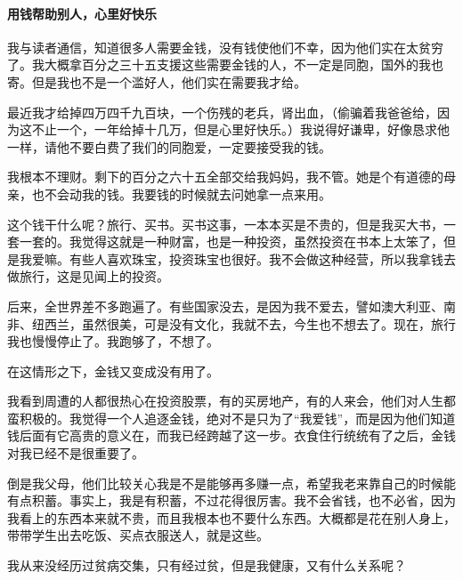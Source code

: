 \paragraph*{用钱帮助别人，心里好快乐}
\par 我与读者通信，知道很多人需要金钱，没有钱使他们不幸，因为他们实在太贫穷了。我大概拿百分之三十五支援这些需要金钱的人，不一定是同胞，国外的我也寄。但是我也不是一个滥好人，他们实在需要我才给。
\par 最近我才给掉四万四千九百块，一个伤残的老兵，肾出血，（偷骗着我爸爸给，因为这不止一个，一年给掉十几万，但是心里好快乐。）我说得好谦卑，好像恳求他一样，请他不要白费了我们的同胞爱，一定要接受我的钱。
\par 我根本不理财。剩下的百分之六十五全部交给我妈妈，我不管。她是个有道德的母亲，也不会动我的钱。我要钱的时候就去问她拿一点来用。
\par 这个钱干什么呢？旅行、买书。买书这事，一本本买是不贵的，但是我买大书，一套一套的。我觉得这就是一种财富，也是一种投资，虽然投资在书本上太笨了，但是我爱嘛。有些人喜欢珠宝，投资珠宝也很好。我不会做这种经营，所以我拿钱去做旅行，这是见闻上的投资。
\par 后来，全世界差不多跑遍了。有些国家没去，是因为我不爱去，譬如澳大利亚、南非、纽西兰，虽然很美，可是没有文化，我就不去，今生也不想去了。现在，旅行我也慢慢停止了。我跑够了，不想了。
\par 在这情形之下，金钱又变成没有用了。
\par 我看到周遭的人都很热心在投资股票，有的买房地产，有的人来会，他们对人生都蛮积极的。我觉得一个人追逐金钱，绝对不是只为了“我爱钱”，而是因为他们知道钱后面有它高贵的意义在，而我已经跨越了这一步。衣食住行统统有了之后，金钱对我已经不是很重要了。
\par 倒是我父母，他们比较关心我是不是能够再多赚一点，希望我老来靠自己的时候能有点积蓄。事实上，我是有积蓄，不过花得很厉害。我不会省钱，也不必省，因为我看上的东西本来就不贵，而且我根本也不要什么东西。大概都是花在别人身上，带带学生出去吃饭、买点衣服送人，就是这些。
\par 我从来没经历过贫病交集，只有经过贫，但是我健康，又有什么关系呢？
